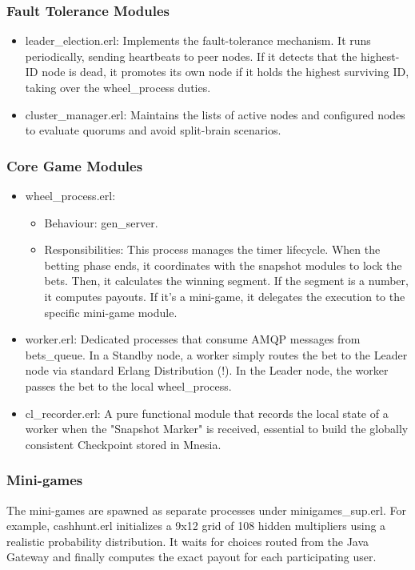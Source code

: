 \documentclass[12pt,a4paper]{article}
\begin{document}
\subsubsection{Fault Tolerance Modules}
\begin{itemize}
    \item leader\_election.erl: Implements the fault-tolerance mechanism. It runs periodically, sending heartbeats to peer nodes. If it detects that the highest-ID node is dead, it promotes its own node if it holds the highest surviving ID, taking over the wheel\_process duties.
    \item cluster\_manager.erl: Maintains the lists of active nodes and configured nodes to evaluate quorums and avoid split-brain scenarios.
\end{itemize}

\subsubsection{Core Game Modules}
\begin{itemize}
    \item wheel\_process.erl:
    \begin{itemize}
        \item Behaviour: gen\_server.
        \item Responsibilities: This process manages the timer lifecycle. When the betting phase ends, it coordinates with the snapshot modules to lock the bets. Then, it calculates the winning segment. If the segment is a number, it computes payouts. If it's a mini-game, it delegates the execution to the specific mini-game module.
    \end{itemize}
    \item worker.erl: Dedicated processes that consume AMQP messages from bets\_queue. In a Standby node, a worker simply routes the bet to the Leader node via standard Erlang Distribution (!). In the Leader node, the worker passes the bet to the local wheel\_process.
    \item cl\_recorder.erl: A pure functional module that records the local state of a worker when the "Snapshot Marker" is received, essential to build the globally consistent Checkpoint stored in Mnesia.
\end{itemize}

\subsubsection{Mini-games}
The mini-games are spawned as separate processes under minigames\_sup.erl. For example, cashhunt.erl initializes a 9x12 grid of 108 hidden multipliers using a realistic probability distribution. It waits for choices routed from the Java Gateway and finally computes the exact payout for each participating user.
\end{document}
